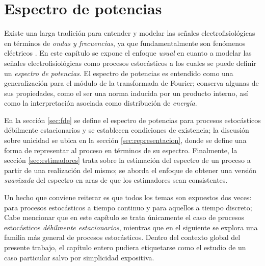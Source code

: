 
\chapter{Espectro de potencias}

Existe una larga tradición para entender y modelar las señales electrofisiológicas en términos de \textit{ondas y frecuencias}, ya que fundamentalmente son fenómenos eléctricos \cite{Kaiser00}.
%
En este capítulo se expone el enfoque \textit{usual} en cuanto a modelar las señales electrofisiológicas como procesos estocásticos a los cuales se puede definir un \textit{espectro de potencias}.
%
El espectro de potencias es entendido como una generalización para el módulo de la transformada de Fourier; conserva algunas de sus propiedades, como el ser una norma inducida por un producto interno, así como la interpretación asociada como distribución de \textit{energía}.

En la sección \ref{sec:fde} se define el espectro de potencias para procesos estocásticos débilmente estacionarios y se establecen condiciones de existencia; la discusión sobre unicidad se ubica en la sección \ref{sec:representacion}, donde se define una forma de representar al proceso en términos de su espectro.
%
Finalmente, la sección \ref{sec:estimadores} trata sobre la estimación del espectro de un proceso a partir de una realización del mismo; se aborda el enfoque de obtener una versión \textit{suavizada} del espectro en aras de que los estimadores sean consistentes.

Un hecho que conviene reiterar es que todos los temas son expuestos dos veces: para procesos estocásticos a tiempo continuo y para aquellos a tiempo discreto; 
%
Cabe mencionar que en este capítulo se trata únicamente el caso de procesos estocásticos \textit{débilmente estacionarios}, mientras que en el siguiente se explora una familia más general de procesos estocásticos.
%
Dentro del contexto global del presente trabajo, el capítulo entero pudiera etiquetarse como el estudio de un caso particular salvo por simplicidad expositiva.


